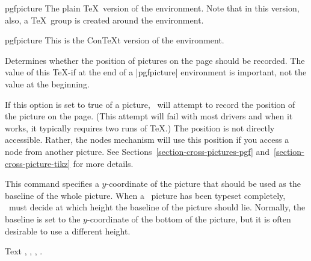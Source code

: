 \begin{plainenvironment}{{pgfpicture}}
  The plain \TeX\ version of the environment. Note that in this
  version, also, a \TeX\ group is created around the environment.
\end{plainenvironment}

\begin{contextenvironment}{{pgfpicture}}
  This is the Con\TeX t version of the environment.
\end{contextenvironment}


{\let\ifpgfrememberpicturepositiononpage=\relax
\begin{command}{\ifpgfrememberpicturepositiononpage}
  Determines whether the position of pictures on the page should be
  recorded. The value of this \TeX-if at the end of a |{pgfpicture}|
  environment is important, not the value at the beginning.

  If this option is set to true of a picture, \pgfname\ will attempt
  to record the position of the picture on the page. (This attempt
  will fail with most drivers and when it works, it typically requires
  two runs of \TeX.) The position is not directly accessible. Rather,
  the nodes mechanism will use this position if you access a node from
  another picture. See Sections~\ref{section-cross-pictures-pgf}
  and~\ref{section-cross-picture-tikz} for more details.
\end{command}
}


\makeatletter
\begin{command}{\pgfsetbaseline{}}
  This command specifies a $y$-coordinate of the picture that should
  be used as the baseline of the whole picture. When a \pgfname\
  picture has been typeset completely, \pgfname\ must decide at which
  height the baseline of the picture should lie. Normally, the
  baseline is set to the $y$-coordinate of the bottom of the picture,
  but it is often desirable to use a different height.

\begin{codeexample}[]
Text ,
     ,
     ,
     .
\end{codeexample}
\end{command}

